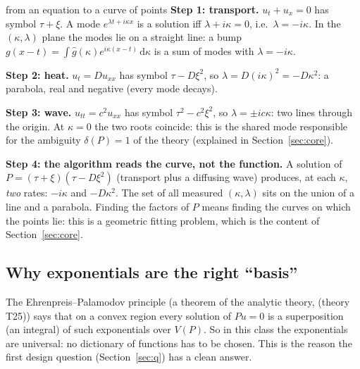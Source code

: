 \documentclass[11pt,a4paper]{article}
\theoremstyle{definition}
\newcommand{\dd}{\,\mathrm{d}}
\newcommand{\thy}[1]{\textcolor{cG}{\textsf{\footnotesize(theory #1)}}}
\begin{document}
\begin{explained}{from an equation to a curve of points}
\textbf{Step 1: transport.} $u_t+u_x=0$ has symbol $\tau+\xi$. A mode $e^{\lambda t+i\kappa x}$ is a solution iff $\lambda+i\kappa=0$, i.e.\ $\lambda=-i\kappa$. In the $(\kappa,\lambda)$ plane the modes lie on a straight line: a bump $g(x-t)=\int\hat g(\kappa)e^{i\kappa(x-t)}\dd\kappa$ is a sum of modes with $\lambda=-i\kappa$.

\medskip\textbf{Step 2: heat.} $u_t=Du_{xx}$ has symbol $\tau-D\xi^2$, so $\lambda=D(i\kappa)^2=-D\kappa^2$: a parabola, real and negative (every mode decays).

\medskip\textbf{Step 3: wave.} $u_{tt}=c^2u_{xx}$ has symbol $\tau^2-c^2\xi^2$, so $\lambda=\pm ic\kappa$: two lines through the origin. At $\kappa=0$ the two roots coincide: this is the shared mode responsible for the ambiguity $\delta(P)=1$ of the theory (explained in Section~\ref{sec:core}).

\medskip\textbf{Step 4: the algorithm reads the curve, not the function.} A solution of $P=(\tau+\xi)(\tau-D\xi^2)$ (transport plus a diffusing wave) produces, at each $\kappa$, \emph{two} rates: $-i\kappa$ and $-D\kappa^2$. The set of all measured $(\kappa,\lambda)$ sits on the union of a line and a parabola. Finding the factors of $P$ means finding the curves on which the points lie: this is a geometric fitting problem, which is the content of Section~\ref{sec:core}.
\end{explained}

\subsection{Why exponentials are the right ``basis''}
The Ehrenpreis--Palamodov principle (a theorem of the analytic theory, \thy{T25}) says that on a convex region every solution of $Pu=0$ is a superposition (an integral) of such exponentials over $V(P)$. So in this class the exponentials are universal: no dictionary of functions has to be chosen. This is the reason the first design question (Section~\ref{sec:q}) has a clean answer.
\end{document}
